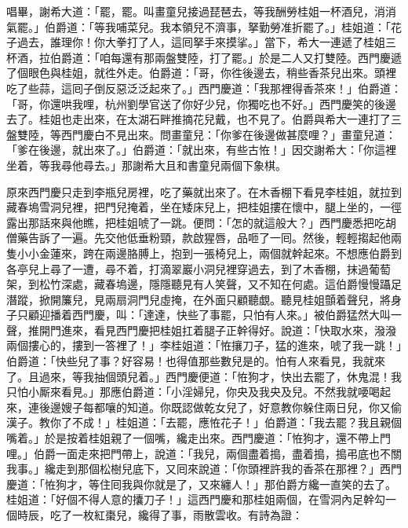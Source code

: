 唱畢，謝希大道：「罷，罷。叫畫童兒接過琵琶去，等我酬勞桂姐一杯酒兒，消消氣罷。」{}伯爵道：「等我哺菜兒。我本領兒不濟事，拏勤勞准折罷了。」桂姐道：「花子過去，誰理你！你大拳打了人，這囘拏手來摸挲。」當下，希大一連遞了桂姐三杯酒，拉伯爵道：「咱每還有那兩盤雙陸，打了罷。」於是二人又打雙陸。西門慶遞了個眼色與桂姐，就徃外走。伯爵道：「哥，你徃後邊去，稍些香茶兒出來。頭裡吃了些蒜，這囘子倒反惡泛泛起來了。」西門慶道：「我那裡得香茶來！」伯爵道：「哥，你還哄我哩，杭州劉學官送了你好少兒，你獨吃也不好。」西門慶笑的後邊去了。桂姐也走出來，在太湖石畔推摘花兒戴，也不見了。伯爵與希大一連打了三盤雙陸，等西門慶白不見出來。問畫童兒：「你爹在後邊做甚麼哩？」畫童兒道：「爹在後邊，就出來了。」伯爵道：「就出來，有些古恠！」因交謝希大：「你這裡坐着，等我尋他尋去。」那謝希大且和書童兒兩個下象棋。

原來西門慶只走到李瓶兒房裡，吃了藥就出來了。在木香棚下看見李桂姐，就拉到藏春塢雪洞兒裡，把門兒掩着，坐在矮床兒上，把桂姐摟在懷中，腿上坐的，一徑露出那話來與他瞧，把桂姐唬了一跳。便問：「怎的就這般大？」西門慶悉把吃胡僧藥告訴了一遍。先交他低垂粉頸，款啟猩唇，品咂了一囘。然後，輕輕搊起他兩隻小小金蓮來，跨在兩邊胳膊上，抱到一張椅兒上，兩個就幹起來。不想應伯爵到各亭兒上尋了一遭，尋不着，打滴翠巖小洞兒裡穿過去，到了木香棚，抹過葡萄架，到松竹深處，藏春塢邊，隱隱聽見有人笑聲，又不知在何處。這伯爵慢慢躡足潛蹤，掀開簾兒，見兩扇洞門兒虛掩，在外面只顧聽覷。聽見桂姐顫着聲兒，將身子只顧迎播着西門慶，叫：「達達，快些了事罷，只怕有人來。」被伯爵猛然大叫一聲，推開門進來，看見西門慶把桂姐扛着腿子正幹得好。說道：「快取水來，潑潑兩個摟心的，摟到一答裡了！」李桂姐道：「恠攘刀子，猛的進來，唬了我一跳！」伯爵道：「快些兒了事？好容易！也得值那些數兒是的。怕有人來看見，我就來了。且過來，等我抽個頭兒着。」{}西門慶便道：「恠狗才，快出去罷了，休鬼混！我只怕小厮來看見。」那應伯爵道：「小淫婦兒，你央及我央及兒。不然我就喓喝起來，連後邊嫂子每都嚷的知道。你既認做乾女兒了，好意教你躲住兩日兒，你又偷漢子。教你了不成！」桂姐道：「去罷，應恠花子！」伯爵道：「我去罷？我且親個嘴着。」於是按着桂姐親了一個嘴，纔走出來。西門慶道：「恠狗才，還不帶上門哩。」伯爵一面走來把門帶上，說道：「我兒，兩個盡着搗，盡着搗，搗弔底也不關我事。」纔走到那個松樹兒底下，又囘來說道：{}「你頭裡許我的香茶在那裡？」西門慶道：「恠狗才，等住囘我與你就是了，又來纏人！」那伯爵方纔一直笑的去了。桂姐道：「好個不得人意的攮刀子！」這西門慶和那桂姐兩個，在雪洞內足幹勾一個時辰，吃了一枚紅棗兒，纔得了事，雨散雲收。有詩為證：

